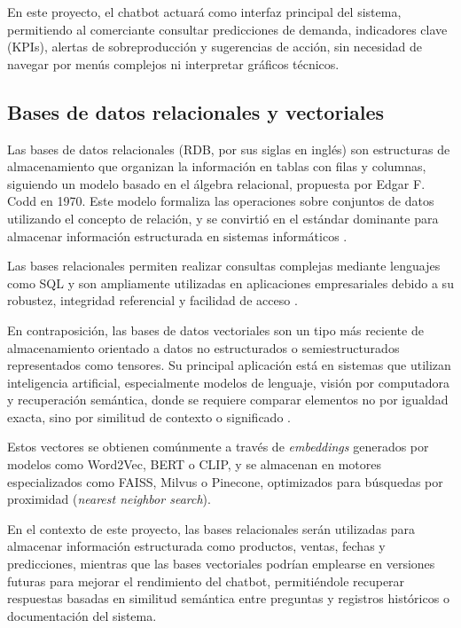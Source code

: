 En este proyecto, el chatbot actuará como interfaz principal del sistema, permitiendo al comerciante consultar predicciones de demanda, indicadores clave (KPIs), alertas de sobreproducción y sugerencias de acción, sin necesidad de navegar por menús complejos ni interpretar gráficos técnicos.

\subsection{Bases de datos relacionales y vectoriales}

Las bases de datos relacionales (RDB, por sus siglas en inglés) son estructuras de almacenamiento que organizan la información en tablas con filas y columnas, siguiendo un modelo basado en el álgebra relacional, propuesta por Edgar F. Codd en 1970. Este modelo formaliza las operaciones sobre conjuntos de datos utilizando el concepto de relación, y se convirtió en el estándar dominante para almacenar información estructurada en sistemas informáticos \parencite{codd1970}. 

Las bases relacionales permiten realizar consultas complejas mediante lenguajes como SQL y son ampliamente utilizadas en aplicaciones empresariales debido a su robustez, integridad referencial y facilidad de acceso \parencite{coronel2020}.

En contraposición, las bases de datos vectoriales son un tipo más reciente de almacenamiento orientado a datos no estructurados o semiestructurados representados como tensores. Su principal aplicación está en sistemas que utilizan inteligencia artificial, especialmente modelos de lenguaje, visión por computadora y recuperación semántica, donde se requiere comparar elementos no por igualdad exacta, sino por similitud de contexto o significado \parencite{johnson2019}.

Estos vectores se obtienen comúnmente a través de \textit{embeddings} generados por modelos como Word2Vec, BERT o CLIP, y se almacenan en motores especializados como FAISS, Milvus o Pinecone, optimizados para búsquedas por proximidad (\textit{nearest neighbor search}).

En el contexto de este proyecto, las bases relacionales serán utilizadas para almacenar información estructurada como productos, ventas, fechas y predicciones, mientras que las bases vectoriales podrían emplearse en versiones futuras para mejorar el rendimiento del chatbot, permitiéndole recuperar respuestas basadas en similitud semántica entre preguntas y registros históricos o documentación del sistema.

